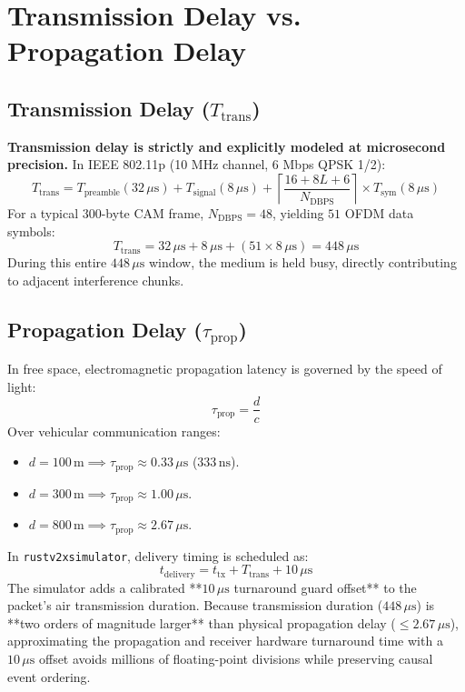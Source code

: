 \documentclass[11pt,a4paper]{article}
\begin{document}
\section{Transmission Delay vs. Propagation Delay}

\subsection{Transmission Delay ($T_{\mathrm{trans}}$)}
\textbf{Transmission delay is strictly and explicitly modeled at microsecond precision.}
In IEEE 802.11p (10 MHz channel, 6 Mbps QPSK 1/2):
\begin{equation}
T_{\mathrm{trans}} = T_{\mathrm{preamble}} (32\,\mu\mathrm{s}) + T_{\mathrm{signal}} (8\,\mu\mathrm{s}) + \left\lceil \frac{16 + 8L + 6}{N_{\mathrm{DBPS}}} \right\rceil \times T_{\mathrm{sym}} (8\,\mu\mathrm{s})
\end{equation}
For a typical $300$-byte CAM frame, $N_{\mathrm{DBPS}} = 48$, yielding $51$ OFDM data symbols:
\begin{equation}
T_{\mathrm{trans}} = 32\,\mu\mathrm{s} + 8\,\mu\mathrm{s} + (51 \times 8\,\mu\mathrm{s}) = 448\,\mu\mathrm{s}
\end{equation}
During this entire $448\,\mu\mathrm{s}$ window, the medium is held busy, directly contributing to adjacent interference chunks.

\subsection{Propagation Delay ($\tau_{\mathrm{prop}}$)}
In free space, electromagnetic propagation latency is governed by the speed of light:
\begin{equation}
\tau_{\mathrm{prop}} = \frac{d}{c}
\end{equation}
Over vehicular communication ranges:
\begin{itemize}[noitemsep]
    \item $d = 100\,\mathrm{m} \implies \tau_{\mathrm{prop}} \approx 0.33\,\mu\mathrm{s}$ ($333\,\text{ns}$).
    \item $d = 300\,\mathrm{m} \implies \tau_{\mathrm{prop}} \approx 1.00\,\mu\mathrm{s}$.
    \item $d = 800\,\mathrm{m} \implies \tau_{\mathrm{prop}} \approx 2.67\,\mu\mathrm{s}$.
\end{itemize}

In \texttt{rustv2xsimulator}, delivery timing is scheduled as:
\begin{equation}
t_{\mathrm{delivery}} = t_{\mathrm{tx}} + T_{\mathrm{trans}} + 10\,\mu\mathrm{s}
\end{equation}
The simulator adds a calibrated **$10\,\mu\mathrm{s}$ turnaround guard offset** to the packet's air transmission duration. Because transmission duration ($448\,\mu\mathrm{s}$) is **two orders of magnitude larger** than physical propagation delay ($\le 2.67\,\mu\mathrm{s}$), approximating the propagation and receiver hardware turnaround time with a $10\,\mu\mathrm{s}$ offset avoids millions of floating-point divisions while preserving causal event ordering.
\end{document}
